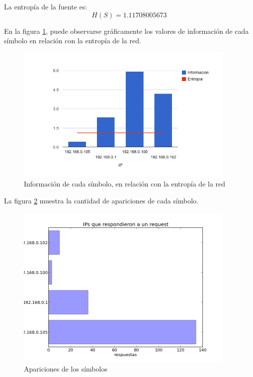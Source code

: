 \documentclass{article}
\begin{document}
\vskip10pt

La entropía de la fuente es:
$$H(S) = 1.11708005673$$

En la figura \ref{fig:red2repliers:infoentro}, puede observarse gráficamente
los valores de información de cada símbolo en relación con la entropía de la
red.

\begin{figure}[h!]
    \centering                                                       
    \includegraphics[width=300pt]{red2/respuestas2.png}
    \caption{Información de cada símbolo, en relación con la
        entropía de la red}
    \label{fig:red2repliers:infoentro}
\end{figure}

La figura \ref{fig:red2repliers:count} muestra la cantidad de apariciones de
cada símbolo.

\begin{figure}[h!]
    \centering
    \includegraphics[width=300pt]{red2/red2repliers.png}
    \caption{Apariciones de los símbolos}
    \label{fig:red2repliers:count}
\end{figure}


\newpage
\end{document}
